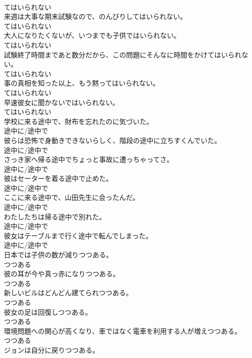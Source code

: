 \documentclass[8pt]{extreport}
\begin{document}
\begin{CJK}{UTF8}{min}
\\	てはいられない
\\	来週は大事な期末試験なので、のんびりしてはいられない。	
\\	てはいられない
\\	大人になりたくないが、いつまでも子供ではいられない。	
\\	てはいられない
\\	試験終了時間まであと数分だから、この問題にそんなに時間をかけてはいられない。	
\\	てはいられない
\\	事の真相を知った以上、もう黙ってはいられない。	
\\	てはいられない
\\	早速彼女に聞かないではいられない。	
\\	てはいられない
\\	学校に来る途中で、財布を忘れたのに気づいた。	
\\	途中に/途中で
\\	彼らは恐怖で身動きできないらしく、階段の途中に立ちすくんでいた。	
\\	途中に/途中で
\\	さっき家へ帰る途中でちょっと事故に遭っちゃってさ。	
\\	途中に/途中で
\\	彼はセーターを着る途中で止めた。	
\\	途中に/途中で
\\	ここに来る途中で、山田先生に会ったんだ。	
\\	途中に/途中で
\\	わたしたちは帰る途中で別れた。	
\\	途中に/途中で
\\	彼女はテーブルまで行く途中で転んでしまった。	
\\	途中に/途中で
\\	日本では子供の数が減りつつある。	
\\	つつある
\\	彼の耳が今や真っ赤になりつつある。	
\\	つつある
\\	新しいビルはどんどん建てられつつある。	
\\	つつある
\\	彼女の足は回復しつつある。	
\\	つつある
\\	環境問題への関心が高くなり、車ではなく電車を利用する人が増えつつある。	
\\	つつある
\\	ジョンは自分に戻りつつある。	

\end{CJK}
\end{document}
